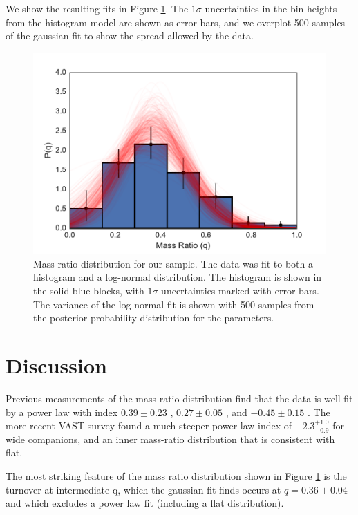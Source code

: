 \documentclass{emulateapj}
\begin{document}
We show the resulting fits in Figure \ref{fig:mrd}. The $1\sigma$ uncertainties in the bin heights from the histogram model are shown as error bars, and we overplot 500 samples of the gaussian fit to show the spread allowed by the data. 

\begin{figure}
\includegraphics[width=\columnwidth]{MRD_normal.pdf}
\caption{Mass ratio distribution for our sample. The data was fit to both a histogram and a log-normal distribution. The histogram is shown in the solid blue blocks, with $1 \sigma$ uncertainties marked with error bars. The variance of the log-normal fit is shown with 500 samples from the posterior probability distribution for the parameters.}
\label{fig:mrd}
\end{figure}




\section{Discussion}
\label{sec:discussion}

Previous measurements of the mass-ratio distribution find that the data is well fit by a power law with index $0.39 \pm 0.23$ \citep[M dwarf stars][]{Delfosse2004}, $0.27 \pm 0.05$ \citep[Solar type stars][]{Duchene2013}, and $-0.45 \pm 0.15$ \citep[intermediate-mass stars][]{Kouwenhoven2007}. The more recent VAST survey found a much steeper power law index of $-2.3^{+1.0}_{-0.9}$ for wide companions, and an inner mass-ratio distribution that is consistent with flat.

The most striking feature of the mass ratio distribution shown in Figure \ref{fig:mrd} is the turnover at intermediate q, which the gaussian fit finds occurs at $q = 0.36 \pm 0.04$ and which excludes a power law fit (including a flat distribution). 
\end{document}
